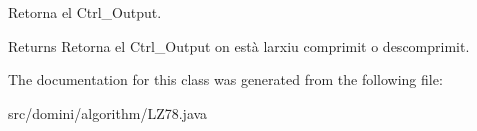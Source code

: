 Retorna el Ctrl\+\_\+\+Output. 

\begin{DoxyReturn}{Returns}
Retorna el Ctrl\+\_\+\+Output on està l\textquotesingle{}arxiu comprimit o descomprimit. 
\end{DoxyReturn}


The documentation for this class was generated from the following file\+:\begin{DoxyCompactItemize}
\item 
src/domini/algorithm/L\+Z78.\+java\end{DoxyCompactItemize}
